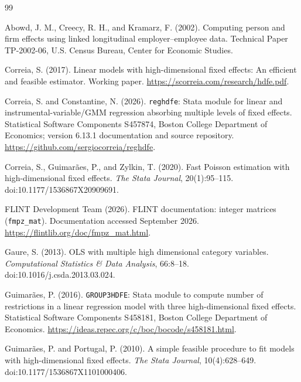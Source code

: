 \documentclass[11pt]{article}
\theoremstyle{definition}
\newcommand{\1}{\mathbf{1}}
\begin{document}


\begin{thebibliography}{99}

Abowd, J. M., Creecy, R. H., and Kramarz, F. (2002).
\newblock Computing person and firm effects using linked longitudinal employer--employee data.
\newblock Technical Paper TP-2002-06, U.S. Census Bureau, Center for Economic Studies.

Correia, S. (2017).
\newblock Linear models with high-dimensional fixed effects: An efficient and feasible estimator.
\newblock Working paper. \url{https://scorreia.com/research/hdfe.pdf}.

Correia, S. and Constantine, N. (2026).
\newblock \texttt{reghdfe}: Stata module for linear and instrumental-variable/GMM regression absorbing multiple levels of fixed effects.
\newblock Statistical Software Components S457874, Boston College Department of Economics; version 6.13.1 documentation and source repository. \url{https://github.com/sergiocorreia/reghdfe}.

Correia, S., Guimar\~aes, P., and Zylkin, T. (2020).
\newblock Fast Poisson estimation with high-dimensional fixed effects.
\newblock \emph{The Stata Journal}, 20(1):95--115. doi:10.1177/1536867X20909691.

FLINT Development Team (2026).
\newblock FLINT documentation: integer matrices (\texttt{fmpz\_mat}).
\newblock Documentation accessed September 2026. \url{https://flintlib.org/doc/fmpz_mat.html}.

Gaure, S. (2013).
\newblock OLS with multiple high dimensional category variables.
\newblock \emph{Computational Statistics \& Data Analysis}, 66:8--18. doi:10.1016/j.csda.2013.03.024.

Guimar\~aes, P. (2016).
\newblock \texttt{GROUP3HDFE}: Stata module to compute number of restrictions in a linear regression model with three high-dimensional fixed effects.
\newblock Statistical Software Components S458181, Boston College Department of Economics. \url{https://ideas.repec.org/c/boc/bocode/s458181.html}.

Guimar\~aes, P. and Portugal, P. (2010).
\newblock A simple feasible procedure to fit models with high-dimensional fixed effects.
\newblock \emph{The Stata Journal}, 10(4):628--649. doi:10.1177/1536867X1101000406.


\end{thebibliography}
\end{document}

